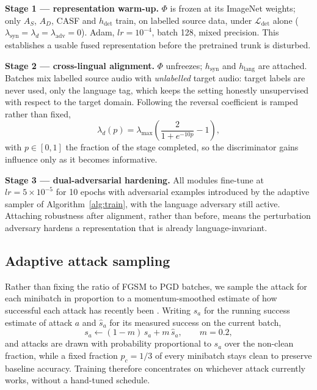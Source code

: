 \documentclass[conference]{IEEEtran}
\newcommand{\Loss}{\mathcal{L}}
\renewcommand{\cite}[1]{\unskip}
\begin{document}
\textbf{Stage 1 --- representation warm-up.} $\Phi$ is frozen at its
ImageNet weights; only $A_S$, $A_D$, CASF and $h_{\mathrm{det}}$ train, on
labelled source data, under $\Loss_{\mathrm{det}}$ alone
($\lambda_{\mathrm{syn}} = \lambda_d = \lambda_{\mathrm{adv}} = 0$). Adam,
$lr = 10^{-4}$, batch 128, mixed precision. This establishes a usable fused
representation before the pretrained trunk is disturbed.

\textbf{Stage 2 --- cross-lingual alignment.} $\Phi$ unfreezes;
$h_{\mathrm{syn}}$ and $h_{\mathrm{lang}}$ are attached. Batches mix
labelled source audio with \emph{unlabelled} target audio: target labels
are never used, only the language tag, which keeps the setting honestly
unsupervised with respect to the target domain. Following
\cite{ganin2016dann} the reversal coefficient is ramped rather than fixed,
\begin{equation}
\lambda_d(p) = \lambda_{\max}\left(\frac{2}{1 + e^{-10p}} - 1\right),
\end{equation}
with $p \in [0,1]$ the fraction of the stage completed, so the
discriminator gains influence only as it becomes informative.

\textbf{Stage 3 --- dual-adversarial hardening.} All modules fine-tune at
$lr = 5 \times 10^{-5}$ for 10 epochs with adversarial examples introduced
by the adaptive sampler of Algorithm~\ref{alg:train}, with the language
adversary still active. Attaching robustness after alignment, rather than
before, means the perturbation adversary hardens a representation that is
already language-invariant.

\subsection{Adaptive attack sampling}
Rather than fixing the ratio of FGSM to PGD batches, we sample the attack
for each minibatch in proportion to a momentum-smoothed estimate of how
successful each attack has recently been \cite{ahmed2026melspec}. Writing
$s_a$ for the running success estimate of attack $a$ and $\hat{s}_a$ for
its measured success on the current batch,
\begin{equation}
s_a \leftarrow (1 - m)\, s_a + m\, \hat{s}_a, \qquad m = 0.2 ,
\end{equation}
and attacks are drawn with probability proportional to $s_a$ over the
non-clean fraction, while a fixed fraction $p_c = 1/3$ of every minibatch
stays clean to preserve baseline accuracy. Training therefore concentrates
on whichever attack currently works, without a hand-tuned schedule.
\end{document}
